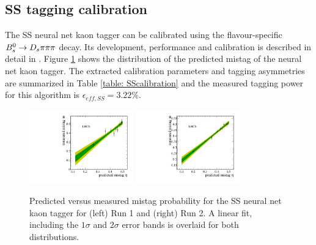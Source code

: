 

\subsection{SS tagging calibration}
\label{subsec: SScalibration}
The SS neural net kaon tagger can be calibrated using the flavour-specific ${{B}^0_{s}}\rightarrow{\ensuremath{{D}_{s}}}{\ensuremath{\pi}}{\ensuremath{\pi}}{\ensuremath{\pi}}$ decay. Its development, performance and calibration is described in detail in \cite{Aaij:2016psi}. 
Figure \ref{fig:SSdistribution} shows the distribution of the predicted mistag of the neural net kaon tagger. 
The extracted calibration parameters and tagging asymmetries are summarized in Table \ref{table: SScalibration} and the measured tagging power for this algorithm is $\epsilon_{eff,SS} = 3.22  \%$.


\begin{figure}[h]
\centering
\includegraphics[height=!,width=0.4\textwidth]{figs/Tagging/Run1/SS_nnetKaon_Calibration.pdf}
\includegraphics[height=!,width=0.4\textwidth]{figs/Tagging/Run2/SS_nnetKaon_Calibration.pdf}
\caption{Predicted versus measured mistag probability for the SS neural net kaon tagger for (left) Run 1 and (right) Run 2. 
A linear fit, including the $1\sigma$ and $2\sigma$ error bands is overlaid for both distributions.}
\label{fig:SSdistribution}
\end{figure}


